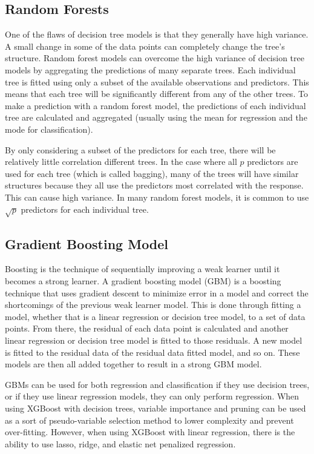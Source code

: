 \documentclass{article}
\begin{document}
\subsection{Random Forests}
One of the flaws of decision tree models is that they generally have high variance. A small change in some of the data points can completely change the tree's structure. Random forest models can overcome the high variance of decision tree models by aggregating the predictions of many separate trees. Each individual tree is fitted using only a subset of the available observations and predictors. This means that each tree will be significantly different from any of the other trees. To make a prediction with a random forest model, the predictions of each individual tree are calculated and aggregated (usually using the mean for regression and the mode for classification).

By only considering a subset of the predictors for each tree, there will be relatively little correlation different trees. In the case where all $p$ predictors are used for each tree (which is called bagging), many of the trees will have similar structures because they all use the predictors most correlated with the response. This can cause high variance. In many random forest models, it is common to use $\sqrt{p}$ predictors for each individual tree.

\subsection{Gradient Boosting Model}
Boosting is the technique of sequentially improving a weak learner until it becomes a strong learner. A gradient boosting model (GBM) is a boosting technique that uses gradient descent to minimize error in a model and correct the shortcomings of the previous weak learner model. This is done through fitting a model, whether that is a linear regression or decision tree model, to a set of data points. From there, the residual of each data point is calculated and another linear regression or decision tree model is fitted to those residuals. A new model is fitted to the residual data of the residual data fitted model, and so on. These models are then all added together to result in a strong GBM model.

GBMs can be used for both regression and classification if they use decision trees, or if they use linear regression models, they can only perform regression. When using XGBoost with decision trees, variable importance and pruning can be used as a sort of pseudo-variable selection method to lower complexity and prevent over-fitting. However, when using XGBoost with linear regression, there is the ability to use lasso, ridge, and elastic net penalized regression.
\end{document}
